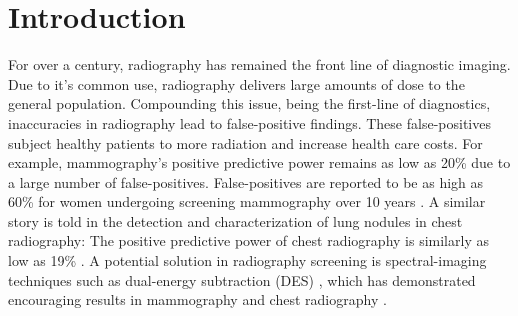 \documentclass[a4paper,11pt]{article}
\begin{document}


\maketitle
%






\section{Introduction}

For over a century, radiography has remained the front line of diagnostic imaging. Due to it's common use, radiography delivers large amounts of dose to the general population. Compounding this issue, being the first-line of diagnostics, inaccuracies in radiography lead to false-positive findings. These false-positives subject healthy patients to more radiation and increase health care costs. For example, mammography's positive predictive power remains as low as 20\% \cite{Skaane2013ProspectiveArbitration., Dickersin2010TheCancer, Kopans1992TheMammography., Mushlin1998EstimatingMeta-analysis, Chiarelli2013DigitalProgram} due to a large number of false-positives. False-positives are reported to be as high as 60\% for women undergoing screening mammography over 10 years \cite{Kerlikowske2013OutcomesTherapy, Hubbard2011CumulativeMammography}. A similar story is told in the detection and characterization of lung nodules in chest radiography: The positive predictive power of chest radiography is similarly as low as 19\% \cite{Monnier-Cholley2001CharacteristicsExperience,Shah2003MissedRetrospect, Quekel1999MissPractice}. A potential solution in radiography screening is spectral-imaging techniques such as dual-energy subtraction (DES) \cite{Alvarez1976Energy-selectiveTomography.}, which has demonstrated encouraging results in mammography \cite{Lemacks2002AAnalysis, Marziani2002Dual-energyX-rays, Taibi2003Dual-energyStudy} and chest radiography \cite{Ricke2003ClinicalRadiography, Niklason1986SimulatedRadiography., Li2008ImprovedRadiography}. 
\end{document}
